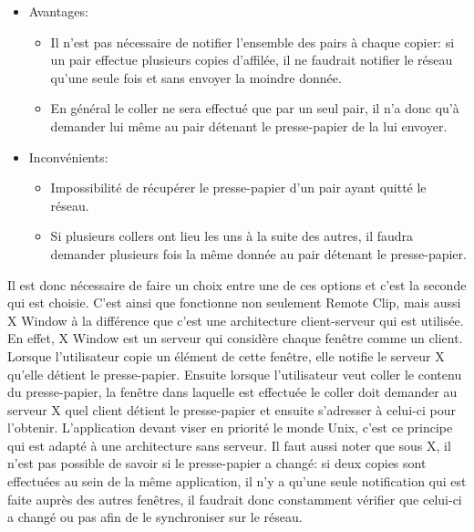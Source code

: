 \begin{itemize}
\item Avantages:
  \begin{itemize}
  \item Il n'est pas nécessaire de notifier l'ensemble des pairs à chaque
    copier: si un pair effectue plusieurs copies d'affilée, il ne faudrait
    notifier le réseau qu'une seule fois et sans envoyer la moindre donnée.
  \item En général le coller ne sera effectué que par un seul pair,
    il n'a donc qu'à demander lui même au pair détenant le presse-papier
    de la lui envoyer.
  \end{itemize}
\item Inconvénients:
  \begin{itemize}
  \item Impossibilité de récupérer le presse-papier d'un pair ayant quitté
    le réseau.
  \item Si plusieurs collers ont lieu les uns à la suite des autres, il faudra
    demander plusieurs fois la même donnée au pair détenant le presse-papier.\\
  \end{itemize}
\end{itemize}

Il est donc nécessaire de faire un choix entre une de ces options
et c'est la seconde qui est choisie. C'est ainsi que fonctionne non seulement
Remote Clip, mais aussi X Window\cite{nye1992xlib} à la différence
que c'est une architecture client-serveur qui est utilisée. En effet, X Window
est un serveur qui considère chaque fenêtre comme un client. Lorsque
l'utilisateur copie un élément de cette fenêtre, elle notifie le serveur X
qu'elle détient le presse-papier. Ensuite lorsque l'utilisateur
veut coller le contenu du presse-papier, la fenêtre dans laquelle est
effectuée le coller doit demander au serveur X quel client détient le
presse-papier et ensuite s'adresser à celui-ci pour l'obtenir. L'application
devant viser en priorité le monde Unix, c'est ce principe qui est adapté à
une architecture sans serveur. Il faut aussi noter que sous X, il n'est pas
possible de savoir si le presse-papier a changé: si deux copies sont
effectuées au sein de la même application, il n'y a qu'une seule notification
qui est faite auprès des autres fenêtres, il faudrait donc constamment
vérifier que celui-ci a changé ou pas afin de le synchroniser sur le
réseau.

